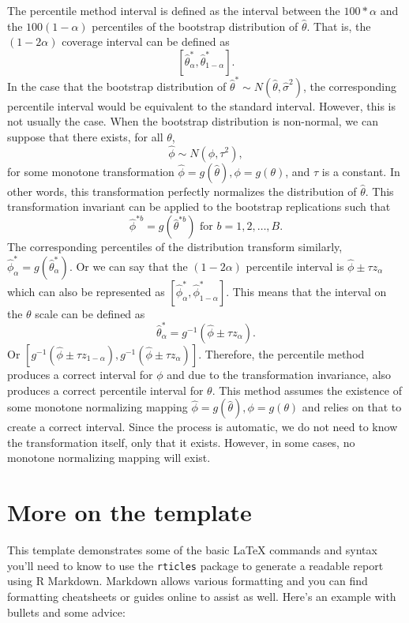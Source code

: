 \documentclass[12pt]{article}
\begin{document}
The percentile method interval is defined as the interval between the
\(100 * \alpha\) and the \(100(1 - \alpha)\) percentiles of the
bootstrap distribution of \(\hat{\theta}\). That is, the
\((1 - 2\alpha)\) coverage interval can be defined as
\[[\hat{\theta}^*_\alpha,\hat{\theta}^*_{1-\alpha}].\] In the case that
the bootstrap distribution of
\(\hat{\theta}^* \sim N(\hat{\theta}, \hat{\sigma}^2)\), the
corresponding percentile interval would be equivalent to the standard
interval. However, this is not usually the case. When the bootstrap
distribution is non-normal, we can suppose that there exists, for all
\(\theta\), \[\hat{\phi} \sim N(\phi, \tau^2),\] for some monotone
transformation \(\hat{\phi} = g(\hat{\theta}), \phi = g(\theta)\), and
\(\tau\) is a constant. In other words, this transformation perfectly
normalizes the distribution of \(\hat{\theta}\). This transformation
invariant can be applied to the bootstrap replications such that
\[\hat{\phi}^{*b} = g\left( \hat{\theta}^{*b}\right ) \text{ for } b = 1,2,\dots, B.\]
The corresponding percentiles of the distribution transform similarly,
\(\hat{\phi}^*_\alpha = g \left ( \hat{\theta}^*_\alpha \right )\). Or
we can say that the \((1 - 2\alpha)\) percentile interval is
\(\hat{\phi} \pm \tau z_\alpha\) which can also be represented as
\([\hat{\phi}^*_\alpha,\hat{\phi}^*_{1-\alpha}]\). This means that the
interval on the \(\theta\) scale can be defined as
\[\hat{\theta}^*_\alpha = g^{-1}(\hat{\phi} \pm \tau z_\alpha).\] Or
\(\left [ g^{-1}(\hat{\phi} \pm \tau z_{1-\alpha}), g^{-1}(\hat{\phi} \pm \tau z_\alpha) \right ]\).
Therefore, the percentile method produces a correct interval for
\(\phi\) and due to the transformation invariance, also produces a
correct percentile interval for \(\theta\). This method assumes the
existence of some monotone normalizing mapping
\(\hat{\phi} = g(\hat{\theta}), \phi = g(\theta)\) and relies on that to
create a correct interval. Since the process is automatic, we do not
need to know the transformation itself, only that it exists. However, in
some cases, no monotone normalizing mapping will exist.

\hypertarget{more-on-the-template}{%
\section{More on the template}\label{more-on-the-template}}

\label{sec:template}

This template demonstrates some of the basic LaTeX commands and syntax
you'll need to know to use the \texttt{rticles} package to generate a
readable report using R Markdown. Markdown allows various formatting and
you can find formatting cheatsheets or guides online to assist as well.
Here's an example with bullets and some advice:
\end{document}
